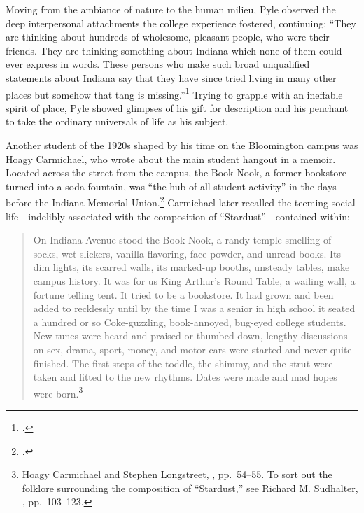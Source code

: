 \documentclass[
  american,
  letterpaper,
]{scrreprt}
\newcounter{none} %
\begin{document}
Moving from the ambiance of nature to the human milieu, Pyle observed
the deep interpersonal attachments the college experience fostered,
continuing: ``They are thinking about hundreds of wholesome, pleasant
people, who were their friends. They are thinking something about
Indiana which none of them could ever express in words. These persons
who make such broad unqualified statements about Indiana say that they
have since tried living in many other places but somehow that tang is
missing.''\footnote{.} Trying
to grapple with an ineffable spirit of place, Pyle showed glimpses of
his gift for description and his penchant to take the ordinary
universals of life as his subject.

Another student of the 1920s shaped by his time on the Bloomington
campus was Hoagy Carmichael, who wrote about the main student hangout in
a memoir. Located across the street from the campus, the Book Nook, a
former bookstore turned into a soda fountain, was ``the hub of all
student activity'' in the days before the Indiana Memorial
Union.\footnote{.} Carmichael later recalled the teeming social life---indelibly
associated with the composition of ``Stardust''---contained within:

\begin{quote}
On Indiana Avenue stood the Book Nook, a randy temple smelling of socks,
wet slickers, vanilla flavoring, face powder, and unread books. Its dim
lights, its scarred walls, its marked-up booths, unsteady tables, make
campus history. It was for us King Arthur's Round Table, a wailing wall,
a fortune telling tent. It tried to be a bookstore. It had grown and
been added to recklessly until by the time I was a senior in high school
it seated a hundred or so Coke-guzzling, book-annoyed, bug-eyed college
students. New tunes were heard and praised or thumbed down, lengthy
discussions on sex, drama, sport, money, and motor cars were started and
never quite finished. The first steps of the toddle, the shimmy, and the
strut were taken and fitted to the new rhythms. Dates were made and mad
hopes were born.\footnote{Hoagy Carmichael and Stephen Longstreet,
  ,
  pp.~54--55. To sort out the folklore surrounding the composition of
  ``Stardust,'' see Richard M. Sudhalter,
  ,
  pp.~103--123.}
\end{quote}
\end{document}

